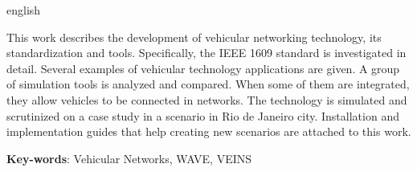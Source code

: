 \documentclass[
12pt,				%
openright,			%
oneside,			%
a4paper,			%
brazil,				%
]{abntex2}
\begin{document}
\begin{resumo}[Abstract]
	\begin{otherlanguage*}{english}
		
		\par This work describes the development of vehicular networking technology, its standardization and tools. Specifically, the IEEE 1609 standard is investigated in detail. Several examples of vehicular technology applications are given. A group of  simulation tools is analyzed and compared. When some of them are integrated, they allow vehicles to be connected in networks. The technology is simulated and scrutinized on a case study in a scenario in Rio de Janeiro city. Installation and implementation guides that help creating new scenarios are attached to this work.			
	 
		\vspace{\onelineskip}
		
		\noindent 
		\textbf{Key-words}: Vehicular Networks, WAVE, VEINS
		
	\end{otherlanguage*}
\end{resumo}
		
	\listoffigures*
	\cleardoublepage
	
	\listoftables*
	\cleardoublepage
	
\end{document}

